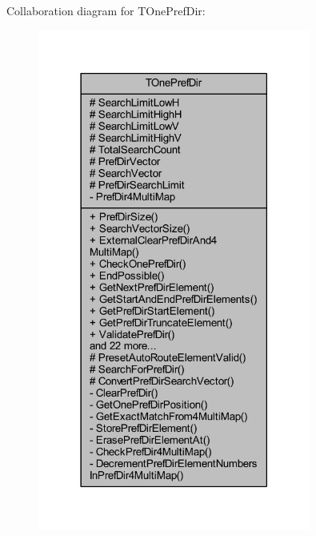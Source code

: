 Collaboration diagram for T\+One\+Pref\+Dir\+:\nopagebreak
\begin{figure}[H]
\begin{center}
\leavevmode
\includegraphics[width=254pt]{class_t_one_pref_dir__coll__graph}
\end{center}
\end{figure}
